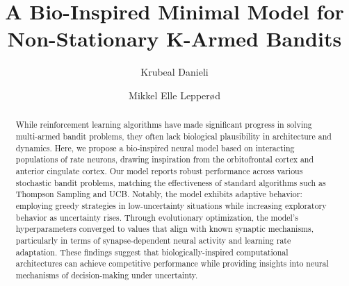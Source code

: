 \documentclass{article}
\title{A Bio-Inspired Minimal Model for Non-Stationary K-Armed Bandits}
\author[1]{Krubeal Danieli}
\author[2]{Mikkel Elle Lepperød}
\affil[1]{Center for Integrative Neuroplasticity, FYSCELL, University of Oslo, Norway}
\affil[2]{Simula Research Laboratory, Oslo, Norway}
\date{} %
\begin{document}
\maketitle

\begin{abstract}
While reinforcement learning algorithms have made significant progress in solving multi-armed bandit problems, they often lack biological plausibility in architecture and dynamics.
Here, we propose a bio-inspired neural model based on interacting populations of rate neurons, drawing inspiration from the orbitofrontal cortex and anterior cingulate cortex.
Our model reports robust performance across various stochastic bandit problems, matching the effectiveness of standard algorithms such as Thompson Sampling and UCB.
Notably, the model exhibits adaptive behavior: employing greedy strategies in low-uncertainty situations while increasing exploratory behavior as uncertainty rises. Through evolutionary optimization, the model's hyperparameters converged to values that align with known synaptic mechanisms,
particularly in terms of synapse-dependent neural activity and learning rate adaptation.
These findings suggest that biologically-inspired computational architectures can achieve competitive performance while providing insights into neural mechanisms of decision-making under uncertainty.
\end{abstract}



\hfill \break
\vspace {0.5cm}

















\newpage


\end{document}
